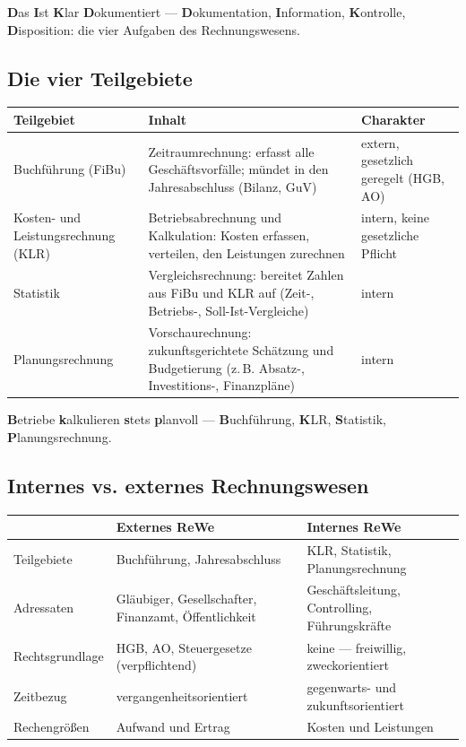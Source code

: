 \documentclass[11pt, a4paper]{article}
\begin{document}
\begin{eselsbruecke}
\textbf{D}as \textbf{I}st \textbf{K}lar \textbf{D}okumentiert --- \textbf{D}okumentation,
\textbf{I}nformation, \textbf{K}ontrolle, \textbf{D}isposition: die vier Aufgaben des
Rechnungswesens.
\end{eselsbruecke}

\subsection{Die vier Teilgebiete}

\begin{center}
\begin{tabular}{p{3.6cm} p{5.4cm} p{4.6cm}}
\textbf{Teilgebiet} & \textbf{Inhalt} & \textbf{Charakter}\\
\hline
Buchführung (FiBu) & Zeitraumrechnung: erfasst alle Geschäftsvorfälle; mündet in den
Jahresabschluss (Bilanz, GuV) & extern, gesetzlich geregelt (HGB, AO)\\
Kosten- und Leistungsrechnung (KLR) & Betriebsabrechnung und Kalkulation: Kosten erfassen,
verteilen, den Leistungen zurechnen & intern, keine gesetzliche Pflicht\\
Statistik & Vergleichsrechnung: bereitet Zahlen aus FiBu und KLR auf (Zeit-, Betriebs-,
Soll-Ist-Vergleiche) & intern\\
Planungsrechnung & Vorschaurechnung: zukunftsgerichtete Schätzung und Budgetierung
(z.\,B. Absatz-, Investitions-, Finanzpläne) & intern\\
\end{tabular}
\end{center}

\begin{eselsbruecke}
\textbf{B}etriebe \textbf{k}alkulieren \textbf{s}tets \textbf{p}lanvoll ---
\textbf{B}uchführung, \textbf{K}LR, \textbf{S}tatistik, \textbf{P}lanungsrechnung.
\end{eselsbruecke}

\subsection{Internes vs. externes Rechnungswesen}

\begin{center}
\begin{tabular}{p{3.2cm} p{5.2cm} p{5.2cm}}
 & \textbf{Externes ReWe} & \textbf{Internes ReWe}\\
\hline
Teilgebiete & Buchführung, Jahresabschluss & KLR, Statistik, Planungsrechnung\\
Adressaten & Gläubiger, Gesellschafter, Finanzamt, Öffentlichkeit & Geschäftsleitung,
Controlling, Führungskräfte\\
Rechtsgrundlage & HGB, AO, Steuergesetze (verpflichtend) & keine --- freiwillig,
zweckorientiert\\
Zeitbezug & vergangenheitsorientiert & gegenwarts- und zukunftsorientiert\\
Rechengrößen & Aufwand und Ertrag & Kosten und Leistungen\\
\end{tabular}
\end{center}
\end{document}
